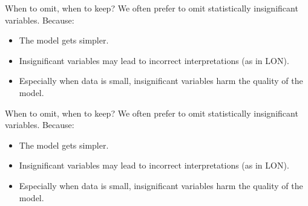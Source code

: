 \documentclass{beamer}\usepackage[]{graphicx}\usepackage[]{color}
\begin{document}
\begin{darkframes}
    
    \begin{frame}{When to omit, when to keep?}
      We often prefer to omit statistically insignificant variables. Because:
      \begin{itemize}
        \item The model gets simpler.
        \item Insignificant variables may lead to incorrect interpretations (as in LON).
        \item Especially when data is small, insignificant variables harm the quality of the model.
        
      \end{itemize}
      
    \end{frame}
    
    \begin{frame}{When to omit, when to keep?}
      We often prefer to omit statistically insignificant variables. Because:
      \begin{itemize}
        \item The model gets simpler.
        \item Insignificant variables may lead to incorrect interpretations (as in LON).
        \item Especially when data is small, insignificant variables harm the quality of the model.
        
      \end{itemize}
      
    \end{frame}
    
 
  \end{darkframes}
\end{document}
